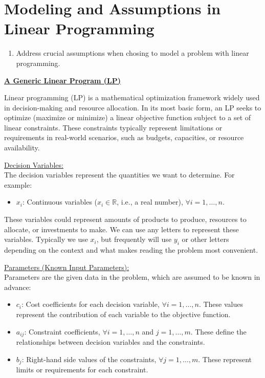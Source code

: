 \section{Modeling and Assumptions in Linear Programming}


\begin{outcome}
\begin{enumerate}
\item Address crucial assumptions when chosing to model a problem with linear programming.
\end{enumerate}
\end{outcome}



\bigskip \underline{\bf A Generic Linear Program (LP)}

Linear programming (LP) is a mathematical optimization framework widely used in decision-making and resource allocation. In its most basic form, an LP seeks to optimize (maximize or minimize) a linear objective function subject to a set of linear constraints. These constraints typically represent limitations or requirements in real-world scenarios, such as budgets, capacities, or resource availability.

\medskip \underline{Decision Variables:}\\
The decision variables represent the quantities we want to determine. For example:
\begin{itemize}
    \item $x_i$: Continuous variables ($x_i \in \mathbb{R}$, i.e., a real number), $\forall i = 1,\dots,n$.
\end{itemize}
These variables could represent amounts of products to produce, resources to allocate, or investments to make.  We can use any letters to represent these variables.  Typically we use $x_i$, but frequently will use $y_i$ or other letters depending on the context and what makes reading the problem most convenient.

\medskip \underline{Parameters (Known Input Parameters):}\\
Parameters are the given data in the problem, which are assumed to be known in advance:
\begin{itemize}
    \item $c_i$: Cost coefficients for each decision variable, $\forall i = 1,\dots,n$. These values represent the contribution of each variable to the objective function.
    \item $a_{ij}$: Constraint coefficients, $\forall i = 1,\dots,n$ and $j = 1,\dots,m$. These define the relationships between decision variables and the constraints.
    \item $b_j$: Right-hand side values of the constraints, $\forall j = 1,\dots,m$. These represent limits or requirements for each constraint.
\end{itemize}

